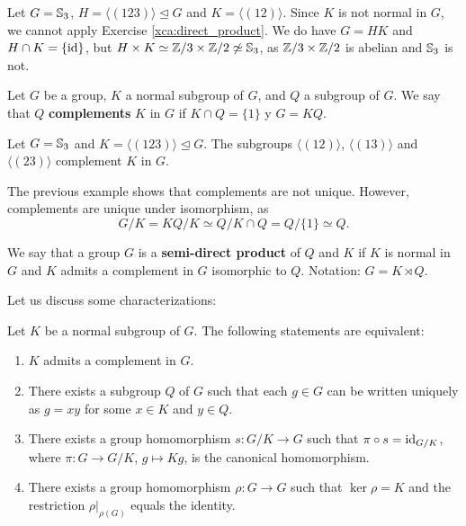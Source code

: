 \begin{example}
Let $G=\mathbb{S}_3$, $H=\langle (123)\rangle\unlhd G$ and $K=\langle (12)\rangle$. Since
$K$ is not normal in $G$, we cannot apply Exercise \ref{xca:direct_product}. 
We do have $G=HK$ and $H\cap K=\{\operatorname{id}\}$, but $H\times K\simeq\mathbb{Z}/3\times\mathbb{Z}/2\not\simeq\mathbb{S}_3$, 
as $\mathbb{Z}/3\times\mathbb{Z}/2$ is abelian and $\mathbb{S}_3$ is not. 
\end{example}


\begin{definition}
Let $G$ be a group, $K$ a normal subgroup of $G$, and $Q$ a subgroup of $G$. We say
that $Q$ \textbf{complements} $K$ in $G$ if $K\cap Q=\{1\}$ y $G=KQ$.
\end{definition}

\begin{example}
Let $G=\mathbb{S}_3$ and $K=\langle (123)\rangle\unlhd G$. The subgroups
$\langle (12)\rangle$, $\langle
(13)\rangle$ and $\langle (23)\rangle$ complement $K$ in $G$.
\end{example}

The previous example shows that complements are not unique. However, 
complements are unique under isomorphism, as 
\[
G/K= KQ/K\simeq Q/K\cap Q=Q/\{1\}\simeq Q.
\]

\begin{definition}
We say that a group $G$ is a \textbf{semi-direct product} of $Q$ and $K$ if $K$ 
is normal in $G$ and 
$K$ admits a complement in $G$ isomorphic to $Q$. Notation: $G=K\rtimes Q$.
\end{definition}

Let us discuss some characterizations:

\begin{proposition}
Let $K$ be a normal subgroup of $G$. The following statements are equivalent:
\begin{enumerate}
\item $K$ admits a complement in $G$.
\item There exists a subgroup $Q$ of $G$ such that each $g\in G$ can be written uniquely 
as $g=xy$ for some 
$x\in K$ and $y\in Q$.
\item There exists a group homomorphism $s\colon G/K\to G$ such that $\pi\circ s=\operatorname{id}_{G/K}$, where $\pi\colon G\to G/K
$, $g\mapsto Kg$, is the canonical homomorphism.
\item There exists a group homomorphism $\rho\colon G\to G$ such that $\ker\rho=K$ and the restriction $\rho|_{\rho(G)}$ equals the identity. 
\end{enumerate}
\end{proposition}


